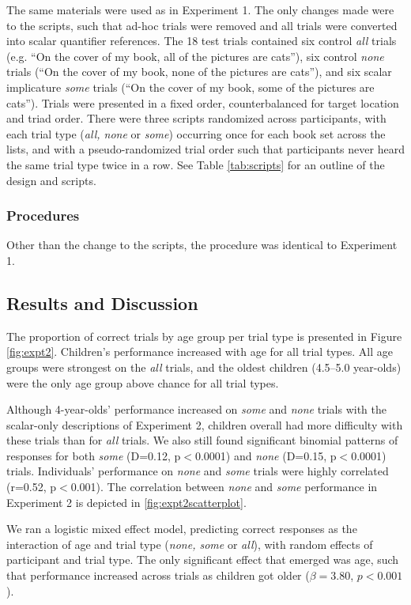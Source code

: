 \documentclass[10pt,letterpaper]{article}
\begin{document}
The same materials were used as in Experiment 1.  The only changes made were to the scripts, such that ad-hoc trials were removed and all trials were converted into scalar quantifier references.  The 18 test trials contained six control \emph{all} trials (e.g. ``On the cover of my book, all of the pictures are cats''), six control \emph{none} trials (``On the cover of my book, none of the pictures are cats''), and six scalar implicature \emph{some} trials (``On the cover of my book, some of the pictures are cats'').  Trials were presented in a fixed order, counterbalanced for target location and triad order.  There were three scripts randomized across participants, with each trial type (\emph{all, none} or \emph{some}) occurring once for each book set across the lists, and with a pseudo-randomized trial order such that participants never heard the same trial type twice in a row. See Table \ref{tab:scripts} for an outline of the design and scripts.

\subsubsection{Procedures}

Other than the change to the scripts, the procedure was identical to Experiment 1. 

\subsection{Results and Discussion}

The proportion of correct trials by age group per trial type is presented in Figure \ref{fig:expt2}.  Children's performance increased with age for all trial types. All age groups were strongest on the \emph{all} trials, and the oldest children (4.5--5.0 year-olds) were the only age group above chance for all trial types.  

Although 4-year-olds' performance increased on \emph{some} and \emph{none} trials with the scalar-only descriptions of Experiment 2, children overall had more difficulty with these trials than for \emph{all} trials. We also still found significant binomial patterns of responses for both \emph{some} (D=0.12, p$<$0.0001) and \emph{none} (D=0.15, p$<$0.0001) trials. Individuals' performance on \emph{none} and \emph{some} trials were highly correlated (r=0.52, p$<$0.001). The correlation between \emph{none} and \emph{some} performance in Experiment 2 is depicted in \ref{fig:expt2scatterplot}.

We ran a logistic mixed effect model, predicting correct responses as the interaction of age and trial type (\emph{none, some} or \emph{all}), with random effects of participant and trial type. The only significant effect that emerged was age, such that performance increased across trials as children got older ($\beta = 3.80$, $p < 0.001$). 
\end{document}

